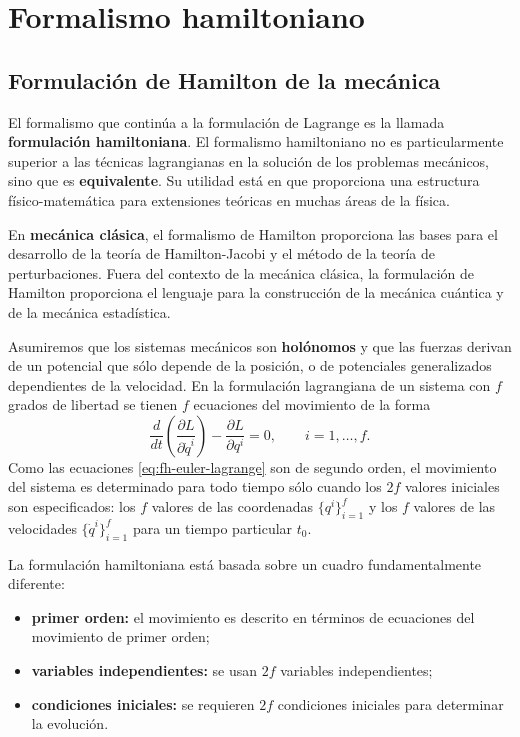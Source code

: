 \documentclass[../apunte_mecanica_clasica.tex]{subfiles}%
\begin{document}
\chapter{Formalismo hamiltoniano}
\label{ch:formalismo-hamiltoniano}

\section{Formulación de Hamilton de la mecánica}
\label{sec:fh-formulacion-hamilton}

El formalismo que continúa a la formulación de Lagrange es la llamada \textbf{formulación hamiltoniana}. El formalismo hamiltoniano no es particularmente superior a las técnicas lagrangianas en la solución de los problemas mecánicos, sino que es \textbf{equivalente}. Su utilidad está en que proporciona una estructura físico-matemática para extensiones teóricas en muchas áreas de la física.

En \textbf{mecánica clásica}, el formalismo de Hamilton proporciona las bases para el desarrollo de la teoría de Hamilton-Jacobi y el método de la teoría de perturbaciones. Fuera del contexto de la mecánica clásica, la formulación de Hamilton proporciona el lenguaje para la construcción de la mecánica cuántica y de la mecánica estadística.

Asumiremos que los sistemas mecánicos son \textbf{holónomos} y que las fuerzas derivan de un potencial que sólo depende de la posición, o de potenciales generalizados dependientes de la velocidad. En la formulación lagrangiana de un sistema con $f$ grados de libertad se tienen $f$ ecuaciones del movimiento de la forma
\begin{equation}
    \frac{d}{dt}\left(\frac{\partial L}{\partial \dot q^i}\right)-\frac{\partial L}{\partial q^i}=0,
    \qquad i=1,\dots,f.
    \label{eq:fh-euler-lagrange}
\end{equation}
Como las ecuaciones \eqref{eq:fh-euler-lagrange} son de segundo orden, el movimiento del sistema es determinado para todo tiempo sólo cuando los $2f$ valores iniciales son especificados: los $f$ valores de las coordenadas $\{q^i\}_{i=1}^{f}$ y los $f$ valores de las velocidades $\{\dot q^i\}_{i=1}^{f}$ para un tiempo particular $t_0$.

La formulación hamiltoniana está basada sobre un cuadro fundamentalmente diferente:
\begin{itemize}
    \item \textbf{primer orden:} el movimiento es descrito en términos de ecuaciones del movimiento de primer orden;
    \item \textbf{variables independientes:} se usan $2f$ variables independientes;
    \item \textbf{condiciones iniciales:} se requieren $2f$ condiciones iniciales para determinar la evolución.
\end{itemize}
\end{document}
